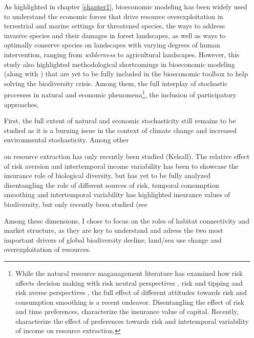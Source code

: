 As highlighted in chapter \ref{chapter1}, bioeconomic modeling has been widely used to understand the economic forces that drive resource overexploitation in terrestrial and marine settings for threatened species, the ways to address invasive species and their damages in forest landscapes, as well as ways to optimally conserve species on landscapes with varying degrees of human intervention, ranging from \textit{wilderness} to agricultural landscapes. However, this study also highlighted methodological shortcomings in bioeconomic modeling (along with \cite{Drechsler20200}) that are yet to be fully included in the  bioeconomic toolbox to help solving the biodiversity crisis. Among them, the full interplay of stochastic processes in natural and economic phenomena\footnote{While the natural resource maganagement literature has examined how risk affects decision making with risk neutral perspectives \citep{reed_1979_optimal, costello_optimal_2008}, risk and tipping \citep{costello_renewable_2019} and risk averse perspectives \citep{McGoughPlantingaCostello+2009,kapaun_does_2013,TAHVONEN2018659}, the full effect of different attitudes towards risk and consumption smoothing is a recent endeavor. Disentangling the effect of risk and time preferences, \citep{quaas_2019_insurance, AugeraudVeron2019} characterize the insurance value of capital. Recently, \citep{KELSALL2023102855} characterize the effect of preferences towards risk and intetemporal variability of income on resource extraction.}, the inclusion of participatory approaches, 

\clearpage
First, the full extent of natural and economic stochasticity still remains to be studied as it is a burning issue in the context of climate change and increased environmental stochasticity.
   Among other 
  
  on resource extraction has only recently been studied (Kelsall). The relative effect of risk aversion and intertemporal income variability has been to showcase the insurance role of biological diversity, but has yet to be fully analyzed   disentangling the role of different sources of risk, temporal consumption smoothing and intertemporal variability has highlighted insurance values of biodiversity, but only recently been studied  (see 


Among these dimensions, I chose to focus on the roles of habitat connectivity and market structure, as they are key to understand and adress the two most important drivers of global biodiversity decline, land/sea use change and overexploitation of resources. 

